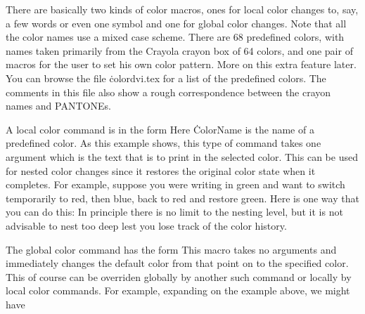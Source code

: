 There are basically two kinds of color macros, ones for local color
changes to, say, a few words or even one symbol and one for global
color changes.  Note that all the color names use a mixed case scheme.
There are 68 predefined colors, with names taken primarily from the
Crayola crayon box of 64 colors, and one pair of macros for the user
to set his own color pattern.  More on this extra feature later. You
can browse the file \.{colordvi.tex} for a list of the predefined colors.
The comments in this file also show a rough correspondence between the
crayon names and PANTONEs.

A local color command is in the form
\noindent
Here \.{ColorName} is the name of a predefined color. As this example
shows, this type of command takes one argument which is the text that
is to print in the selected color.  This can be used for nested color
changes since it restores the original color state when it completes.
For example, suppose you were writing in green and want to switch
temporarily to red, then blue, back to red and restore green.  Here is
one way that you can do this:
\noindent
In principle there is no limit to the nesting level, but it is not
advisable to nest too deep lest you lose track of the color history.
 
The global color command has the form
\noindent 
This macro takes no arguments and immediately changes the default
color from that point on to the specified color. This of course can be
overriden globally by another such command or locally by local color
commands. For example, expanding on the example above, we might have
 
